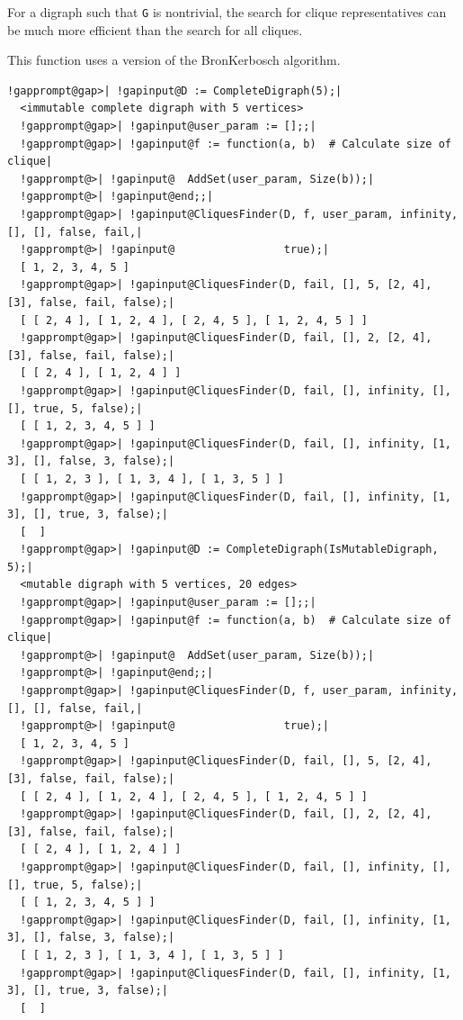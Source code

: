 \documentclass[a4paper,11pt]{report}
\begin{document}
{{{\begin{description}
 For a digraph such that \texttt{G} is non\texttt{}trivial, the search for clique representatives can
be much more efficient than the search for all cliques. 
\end{description}
 This function uses a version of the Bron\texttt{}Kerbosch
algorithm. 
\begin{Verbatim}[commandchars=!@|,fontsize=\small,frame=single,label=Example]
  !gapprompt@gap>| !gapinput@D := CompleteDigraph(5);|
  <immutable complete digraph with 5 vertices>
  !gapprompt@gap>| !gapinput@user_param := [];;|
  !gapprompt@gap>| !gapinput@f := function(a, b)  # Calculate size of clique|
  !gapprompt@>| !gapinput@  AddSet(user_param, Size(b));|
  !gapprompt@>| !gapinput@end;;|
  !gapprompt@gap>| !gapinput@CliquesFinder(D, f, user_param, infinity, [], [], false, fail,|
  !gapprompt@>| !gapinput@                 true);|
  [ 1, 2, 3, 4, 5 ]
  !gapprompt@gap>| !gapinput@CliquesFinder(D, fail, [], 5, [2, 4], [3], false, fail, false);|
  [ [ 2, 4 ], [ 1, 2, 4 ], [ 2, 4, 5 ], [ 1, 2, 4, 5 ] ]
  !gapprompt@gap>| !gapinput@CliquesFinder(D, fail, [], 2, [2, 4], [3], false, fail, false);|
  [ [ 2, 4 ], [ 1, 2, 4 ] ]
  !gapprompt@gap>| !gapinput@CliquesFinder(D, fail, [], infinity, [], [], true, 5, false);|
  [ [ 1, 2, 3, 4, 5 ] ]
  !gapprompt@gap>| !gapinput@CliquesFinder(D, fail, [], infinity, [1, 3], [], false, 3, false);|
  [ [ 1, 2, 3 ], [ 1, 3, 4 ], [ 1, 3, 5 ] ]
  !gapprompt@gap>| !gapinput@CliquesFinder(D, fail, [], infinity, [1, 3], [], true, 3, false);|
  [  ]
  !gapprompt@gap>| !gapinput@D := CompleteDigraph(IsMutableDigraph, 5);|
  <mutable digraph with 5 vertices, 20 edges>
  !gapprompt@gap>| !gapinput@user_param := [];;|
  !gapprompt@gap>| !gapinput@f := function(a, b)  # Calculate size of clique|
  !gapprompt@>| !gapinput@  AddSet(user_param, Size(b));|
  !gapprompt@>| !gapinput@end;;|
  !gapprompt@gap>| !gapinput@CliquesFinder(D, f, user_param, infinity, [], [], false, fail,|
  !gapprompt@>| !gapinput@                 true);|
  [ 1, 2, 3, 4, 5 ]
  !gapprompt@gap>| !gapinput@CliquesFinder(D, fail, [], 5, [2, 4], [3], false, fail, false);|
  [ [ 2, 4 ], [ 1, 2, 4 ], [ 2, 4, 5 ], [ 1, 2, 4, 5 ] ]
  !gapprompt@gap>| !gapinput@CliquesFinder(D, fail, [], 2, [2, 4], [3], false, fail, false);|
  [ [ 2, 4 ], [ 1, 2, 4 ] ]
  !gapprompt@gap>| !gapinput@CliquesFinder(D, fail, [], infinity, [], [], true, 5, false);|
  [ [ 1, 2, 3, 4, 5 ] ]
  !gapprompt@gap>| !gapinput@CliquesFinder(D, fail, [], infinity, [1, 3], [], false, 3, false);|
  [ [ 1, 2, 3 ], [ 1, 3, 4 ], [ 1, 3, 5 ] ]
  !gapprompt@gap>| !gapinput@CliquesFinder(D, fail, [], infinity, [1, 3], [], true, 3, false);|
  [  ]
\end{Verbatim}
 }

}}
\end{document}
